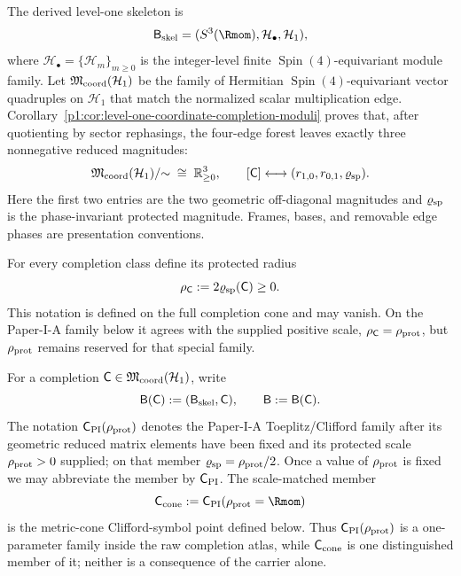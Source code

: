 \documentclass[11pt]{article}
\begin{document}
\begin{definition}
\label{p1:def:s3one-finite-geometry-datum}
The derived level-one skeleton is
\[
    \mathsf B_{\rm skel}
    =
    (S^3(\Rmom),\mathcal H_\bullet,\mathcal H_1),
\]
where \(\mathcal H_\bullet=\{\mathcal H_m\}_{m\ge0}\) is the integer-level
finite \(\operatorname{Spin}(4)\)-equivariant module family.  Let
\(\mathfrak M_{\rm coord}(\mathcal H_1)\) be the family of Hermitian
\(\operatorname{Spin}(4)\)-equivariant vector quadruples on \(\mathcal H_1\) that match the
normalized scalar multiplication edge.  Corollary~\ref{p1:cor:level-one-coordinate-completion-moduli}
proves that, after quotienting by sector rephasings, the four-edge forest
leaves exactly three nonnegative reduced magnitudes:
\[
 \mathfrak M_{\rm coord}(\mathcal H_1)/{\sim}
 \;\cong\;
 \mathbb R_{\ge0}^{3},
 \qquad
 [\mathsf C]\longleftrightarrow
 (r_{1,0},r_{0,1},\varrho_{\rm sp}).
\]
Here the first two entries are the two geometric off-diagonal magnitudes and
\(\varrho_{\rm sp}\) is the phase-invariant protected magnitude.  Frames,
bases, and removable edge phases are presentation conventions.

For every completion class define its protected radius
\[
 \rho_{\mathsf C}:=2\varrho_{\rm sp}(\mathsf C)\ge0.
\]
This notation is defined on the full completion cone and may vanish.  On the
Paper-I-A family below it agrees with the supplied positive scale,
\(\rho_{\mathsf C}=\rho_{\rm prot}\), but \(\rho_{\rm prot}\) remains
reserved for that special family.

For a completion \(\mathsf C\in\mathfrak M_{\rm coord}(\mathcal H_1)\), write
\[
 \mathsf B(\mathsf C):=(\mathsf B_{\rm skel},\mathsf C),
 \qquad \mathsf B:=\mathsf B(\mathsf C).
\]
The notation \(\mathsf C_{\rm PI}(\rho_{\rm prot})\) denotes the Paper-I-A
Toeplitz/Clifford family after its geometric reduced matrix elements have been
fixed and its protected scale \(\rho_{\rm prot}>0\) supplied; on that member
\(\varrho_{\rm sp}=\rho_{\rm prot}/2\).  Once a value of
\(\rho_{\rm prot}\) is fixed we may abbreviate the member by
\(\mathsf C_{\rm PI}\).  The scale-matched member
\[
 \mathsf C_{\rm cone}:=
 \mathsf C_{\rm PI}(\rho_{\rm prot}=\Rmom)
\]
is the metric-cone Clifford-symbol point defined below.  Thus
\(\mathsf C_{\rm PI}(\rho_{\rm prot})\) is a one-parameter family inside the
raw completion atlas, while \(\mathsf C_{\rm cone}\) is one distinguished
member of it; neither is a consequence of the carrier alone.


\end{definition}
\end{document}
